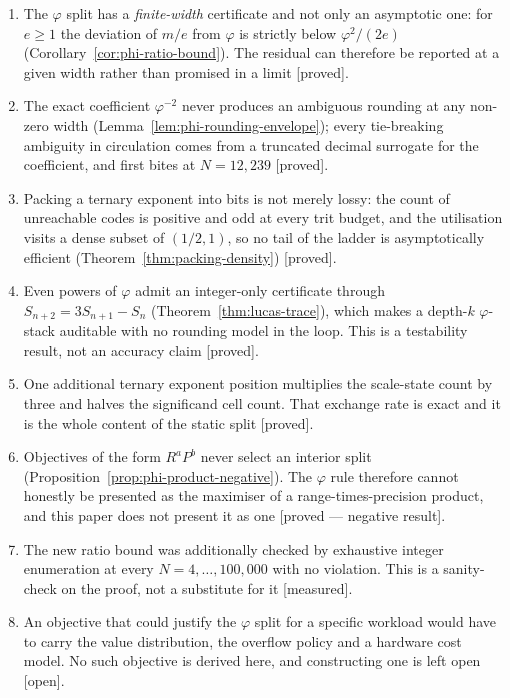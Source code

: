 \begin{enumerate}
\item The $\varphi$ split has a \emph{finite-width} certificate and not only an
asymptotic one: for $e\geq1$ the deviation of $m/e$ from $\varphi$ is strictly
below $\varphi^{2}/(2e)$ (Corollary~\ref{cor:phi-ratio-bound}). The residual can
therefore be reported at a given width rather than promised in a limit
[proved].

\item The exact coefficient $\varphi^{-2}$ never produces an ambiguous rounding at
any non-zero width (Lemma~\ref{lem:phi-rounding-envelope}); every tie-breaking
ambiguity in circulation comes from a truncated decimal surrogate for the
coefficient, and first bites at $N=12{,}239$ [proved].

\item Packing a ternary exponent into bits is not merely lossy: the count of
unreachable codes is positive and odd at every trit budget, and the utilisation
visits a dense subset of $(1/2,1)$, so no tail of the ladder is asymptotically
efficient (Theorem~\ref{thm:packing-density}) [proved].

\item Even powers of $\varphi$ admit an integer-only certificate through
$S_{n+2}=3S_{n+1}-S_n$ (Theorem~\ref{thm:lucas-trace}), which makes a depth-$k$
$\varphi$-stack auditable with no rounding model in the loop. This is a testability
result, not an accuracy claim [proved].

\item One additional ternary exponent position multiplies the scale-state count by
three and halves the significand cell count. That exchange rate is exact and it is
the whole content of the static split [proved].

\item Objectives of the form $R^{a}P^{b}$ never select an interior split
(Proposition~\ref{prop:phi-product-negative}). The $\varphi$ rule therefore cannot
honestly be presented as the maximiser of a range-times-precision product, and
this paper does not present it as one [proved --- negative result].

\item The new ratio bound was additionally checked by exhaustive integer
enumeration at every $N=4,\dots,100{,}000$ with no violation. This is a
sanity-check on the proof, not a substitute for it [measured].

\item An objective that could justify the $\varphi$ split for a specific workload
would have to carry the value distribution, the overflow policy and a hardware
cost model. No such objective is derived here, and constructing one is left open
[open].
\end{enumerate}

